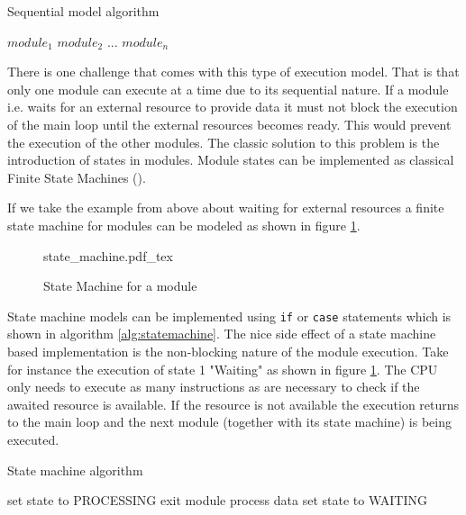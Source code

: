 \begin{algorithm}[H]
\caption{Sequential model algorithm}
\label{alg:sequential execution}
\begin{algorithmic}
\STATE $module_1$
\STATE $module_2$
\STATE $...$
\STATE $module_n$
\ENDWHILE
\end{algorithmic}
\end{algorithm}

There is one challenge that comes with this type of execution model. That is that only one module can execute at a time due to its sequential nature. If a module i.e. waits for an external resource to provide data it must not block the execution of the main loop until the external resources becomes ready. This would prevent the execution of the other modules. The classic solution to this problem is the introduction of states in modules. Module states can be implemented as classical Finite State Machines (\cite{booth}).

If we take the example from above about waiting for external resources a finite state machine for modules can be modeled as shown in figure \ref{fig:statemachine}.

\begin{figure}[H]
\centering
{state_machine.pdf_tex}
\caption{State Machine for a module}
\label{fig:statemachine}
\end{figure}

State machine models can be implemented using \texttt{if} or \texttt{case} statements which is shown in algorithm \ref{alg:statemachine}. The nice side effect of a state machine based implementation is the non-blocking nature of the module execution. Take for instance the execution of state 1 "Waiting" as shown in figure \ref{fig:statemachine}. The CPU only needs to execute as many instructions as are necessary to check if the awaited resource is available. If the resource is not available the execution returns to the main loop and the next module (together with its state machine) is being executed.

\begin{algorithm}[H]
\caption{State machine algorithm}
\label{alg:statemachine}
\begin{algorithmic}
        \STATE set state to PROCESSING
    \ELSE
        \STATE exit module
    \ENDIF
{}
    \STATE process data
    \STATE set state to WAITING
\ENDIF
\end{algorithmic}
\end{algorithm}


